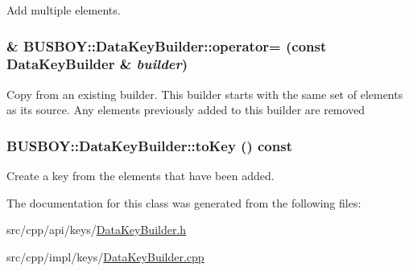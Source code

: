 Add multiple elements. \hypertarget{classBUSBOY_1_1DataKeyBuilder_a70b9d0de3fbfb9140c79b53335e9bcde}{
\subsubsection[{operator=}]{ \& BUSBOY::DataKeyBuilder::operator= (const {\bf DataKeyBuilder} \& {\em builder})}}
\label{classBUSBOY_1_1DataKeyBuilder_a70b9d0de3fbfb9140c79b53335e9bcde}


Copy from an existing builder. This builder starts with the same set of elements as its source. Any elements previously added to this builder are removed \hypertarget{classBUSBOY_1_1DataKeyBuilder_ab1f70cd319860cca1bc8ec29726fdf2d}{
\subsubsection[{toKey}]{ BUSBOY::DataKeyBuilder::toKey () const}}
\label{classBUSBOY_1_1DataKeyBuilder_ab1f70cd319860cca1bc8ec29726fdf2d}


Create a key from the elements that have been added. 

The documentation for this class was generated from the following files:\begin{DoxyCompactItemize}
\item 
src/cpp/api/keys/\hyperlink{DataKeyBuilder_8h}{DataKeyBuilder.h}\item 
src/cpp/impl/keys/\hyperlink{DataKeyBuilder_8cpp}{DataKeyBuilder.cpp}\end{DoxyCompactItemize}

